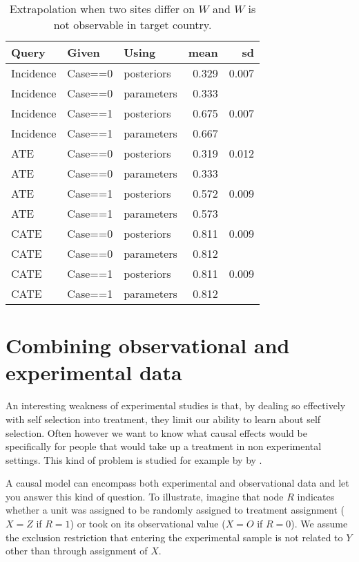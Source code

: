 \documentclass[
  12pt,
]{book}
\begin{document}
\begin{table}

\caption{\label{tab:unnamed-chunk-111}Extrapolation when two sites differ on $W$ and $W$ is not observable in target country.}
\centering
\begin{tabular}[t]{l|l|l|r|r}
\hline
Query & Given & Using & mean & sd\\
\hline
Incidence & Case==0 & posteriors & 0.329 & 0.007\\
\hline
Incidence & Case==0 & parameters & 0.333 & \\
\hline
Incidence & Case==1 & posteriors & 0.675 & 0.007\\
\hline
Incidence & Case==1 & parameters & 0.667 & \\
\hline
ATE & Case==0 & posteriors & 0.319 & 0.012\\
\hline
ATE & Case==0 & parameters & 0.333 & \\
\hline
ATE & Case==1 & posteriors & 0.572 & 0.009\\
\hline
ATE & Case==1 & parameters & 0.573 & \\
\hline
CATE & Case==0 & posteriors & 0.811 & 0.009\\
\hline
CATE & Case==0 & parameters & 0.812 & \\
\hline
CATE & Case==1 & posteriors & 0.811 & 0.009\\
\hline
CATE & Case==1 & parameters & 0.812 & \\
\hline
\end{tabular}
\end{table}

\hypertarget{combining-observational-and-experimental-data}{%
\section{Combining observational and experimental data}\label{combining-observational-and-experimental-data}}

An interesting weakness of experimental studies is that, by dealing so effectively with self selection into treatment, they limit our ability to learn about self selection. Often however we want to know what causal effects would be specifically for people that would take up a treatment in non experimental settings. This kind of problem is studied for example by by \citet{knox2019design}.

A causal model can encompass both experimental and observational data and let you answer this kind of question. To illustrate, imagine that node \(R\) indicates whether a unit was assigned to be randomly assigned to treatment assignment (\(X=Z\) if \(R=1\)) or took on its observational value (\(X=O\) if \(R=0\)). We assume the exclusion restriction that entering the experimental sample is not related to \(Y\) other than through assignment of \(X\).
\end{document}
